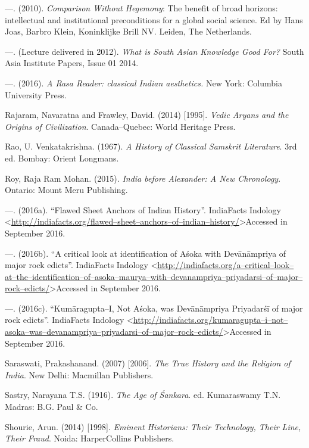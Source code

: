 \begin{thebibliography}{99}
  —. (2010). \textit{Comparison Without Hegemony}: The benefit of broad horizons: intellectual and institutional preconditions for a global social science. Ed by Hans Joas, Barbro Klein, Koninklijke Brill NV. Leiden, The Netherlands.

  —. (Lecture delivered in 2012). \textit{What is South Asian Knowledge Good For?} South Asia Institute Papers, Issue 01 2014.

  —. (2016). \textit{A Rasa Reader: classical Indian aesthetics.} New York: Columbia University Press.

  Rajaram, Navaratna and Frawley, David. (2014) [1995]. \textit{Vedic Aryans and the Origins of Civilization}. Canada–Quebec: World Heritage Press.

  Rao, U. Venkatakrishna. (1967). \textit{A History of Classical Samskrit Literature}. 3rd ed. Bombay: Orient Longmans.

  Roy, Raja Ram Mohan. (2015). \textit{India before Alexander: A New Chronology}. Ontario: Mount Meru Publishing.

  —. (2016a). “Flawed Sheet Anchors of Indian History”. IndiaFacts Indology \textless \underline{http://indiafacts.org/flawed–sheet–anchors–of–indian–history/}\textgreater  Accessed in September 2016.

  —. (2016b). “A critical look at identification of Aśoka with Devānāmpriya of major rock edicts”. IndiaFacts Indology \textless \url{http://indiafacts.org/a–critical–look–at–the–identification–of–asoka–maurya–with–devanampriya–priyadarsi–of–major–rock–edicts/}\textgreater  Accessed in September 2016.

  —. (2016c). “Kumāragupta–I, Not Aśoka, was Devānāmpriya Priyadarśī of major rock edicts”. IndiaFacts Indology \textless \url{http://indiafacts.org/kumaragupta–i–not–asoka–was–devanampriya–priyadarsi–of–major–rock–edicts/}\textgreater  Accessed in September 2016.

  Saraswati, Prakashanand. (2007) [2006]. \textit{The True History and the Religion of India}. New Delhi: Macmillan Publishers.

  Sastry, Narayana T.S. (1916). \textit{The Age of Śankara}. ed. Kumaraswamy T.N. Madras: B.G. Paul \& Co.

  Shourie, Arun. (2014) [1998]. \textit{Eminent Historians: Their Technology, Their Line, Their Fraud}. Noida: HarperCollins Publishers.


\end{thebibliography}
